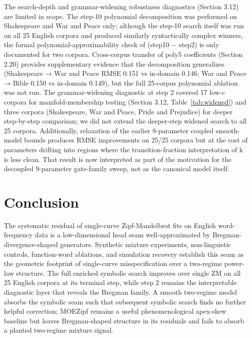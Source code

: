 \documentclass[11pt]{article}
\begin{document}
The search-depth and grammar-widening robustness diagnostics (Section 3.12) are limited in scope. The step-10 polynomial decomposition was performed on Shakespeare and War and Peace only; although the step-10 search itself was run on all 25 English corpora and produced similarly syntactically complex winners, the formal polynomial-approximability check of (step10 − step2) is only documented for two corpora. Cross-corpus transfer of poly5 coefficients (Section 2.20) provides supplementary evidence that the decomposition generalizes (Shakespeare → War and Peace RMSE 0.151 vs in-domain 0.146; War and Peace → Bible 0.150 vs in-domain 0.149), but the full 25-corpus polynomial ablation was not run. The grammar-widening diagnostic at step 2 covered 17 low-c corpora for manifold-membership testing (Section 3.12, Table~\ref{tab:widened}) and three corpora (Shakespeare, War and Peace, Pride and Prejudice) for deeper step-by-step comparison; we did not extend the deeper-step widened search to all 25 corpora. Additionally, relaxation of the earlier 8-parameter coupled smooth-model bounds produces RMSE improvements on 25/25 corpora but at the cost of parameters drifting into regions where the transition-fraction interpretation of k is less clean. That result is now interpreted as part of the motivation for the decoupled 9-parameter gate-family sweep, not as the canonical model itself.

\section{Conclusion}

The systematic residual of single-curve Zipf-Mandelbrot fits on English word-frequency data is a low-dimensional head seam well-approximated by Bregman-divergence-shaped generators. Synthetic mixture experiments, non-linguistic controls, function-word ablations, and simulation recovery establish this seam as the geometric footprint of single-curve misspecification over a two-regime power-law structure. The full enriched symbolic search improves over single ZM on all 25 English corpora at its terminal step, while step 2 remains the interpretable diagnostic layer that reveals the Bregman family. A smooth two-regime model absorbs the symbolic seam such that subsequent symbolic search finds no further helpful correction; MOEZipf remains a useful phenomenological apex-skew baseline but leaves Bregman-shaped structure in its residuals and fails to absorb a planted two-regime mixture signal.
\end{document}
